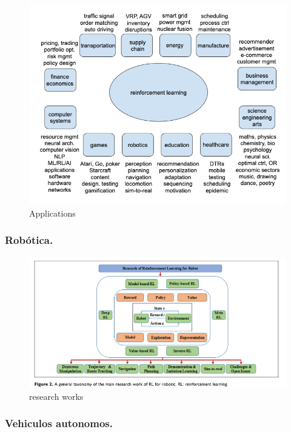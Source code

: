 \documentclass{svproc}
\begin{document}
\begin{figure}[ht]
    \centering
    \includegraphics[width=1\textwidth]{figures/RL-apps.png}
    \caption{Applications}
    \label{fig:RL applicability}
\end{figure}


\subsubsection{Robótica.}\label{ss:robotica}

\begin{figure}[ht]
    \centering
    \includegraphics[width=1\textwidth]{figures/researchwork_robotics.png}
    \caption{research works}
    \label{fig:robotics_research}
\end{figure}


\subsubsection{Vehiculos autonomos.}\label{ss:vehi_auton}



%

\end{document}
